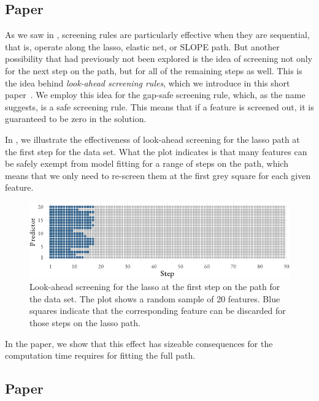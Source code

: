 \subsection{Paper \II}

As we saw in , screening rules are particularly effective when they are sequential, that is, operate along the lasso, elastic net, or SLOPE path. But another possibility that had previously not been explored is the idea of screening not only for the next step on the path, but for all of the remaining steps as well. This is the idea behind \emph{look-ahead screening rules}, which we introduce in this short paper~\parencite{larsson2021}. We employ this idea for the gap-safe screening rule, which, as the name suggests, is a safe screening rule. This means that if a feature is screened out, it is guaranteed to be zero in the solution.

In , we illustrate the effectiveness of look-ahead screening for the lasso path at the first step for the  data set. What the plot indicates is that many features can be safely exempt from model fitting for a range of steps on the path, which means that we only need to re-screen them at the first grey square for each given feature.

\begin{figure}[htpb]
  \centering
  \includegraphics[]{figures/paper2-highlight.pdf}
  \caption{%
    Look-ahead screening for the lasso at the first step on the path for the  data set. The plot shows a random sample of 20 features. Blue squares indicate that the corresponding feature can be discarded for those steps on the lasso path.
  }
  \label{fig:paper2-highlight}
\end{figure}

In the paper, we show that this effect has sizeable consequences for the computation time requires for fitting the full path.

\subsection{Paper \III}

